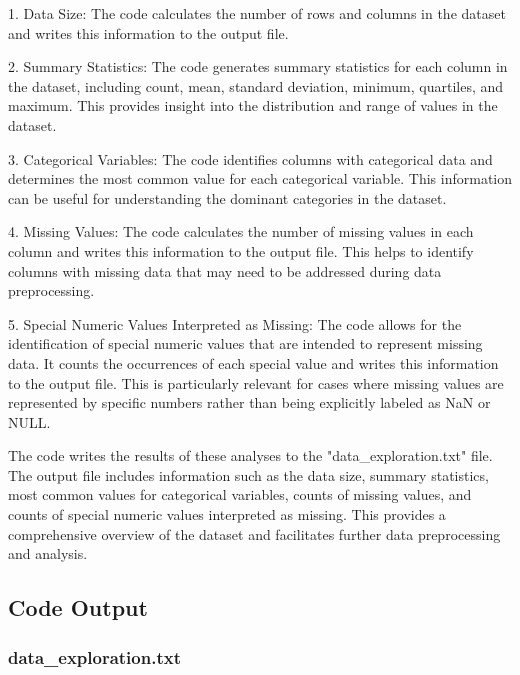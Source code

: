 \documentclass[11pt]{article}
\begin{document}
1. Data Size: The code calculates the number of rows and columns in the dataset and writes this information to the output file.

2. Summary Statistics: The code generates summary statistics for each column in the dataset, including count, mean, standard deviation, minimum, quartiles, and maximum. This provides insight into the distribution and range of values in the dataset.

3. Categorical Variables: The code identifies columns with categorical data and determines the most common value for each categorical variable. This information can be useful for understanding the dominant categories in the dataset.

4. Missing Values: The code calculates the number of missing values in each column and writes this information to the output file. This helps to identify columns with missing data that may need to be addressed during data preprocessing.

5. Special Numeric Values Interpreted as Missing: The code allows for the identification of special numeric values that are intended to represent missing data. It counts the occurrences of each special value and writes this information to the output file. This is particularly relevant for cases where missing values are represented by specific numbers rather than being explicitly labeled as NaN or NULL.

The code writes the results of these analyses to the "data\_exploration.txt" file. The output file includes information such as the data size, summary statistics, most common values for categorical variables, counts of missing values, and counts of special numeric values interpreted as missing. This provides a comprehensive overview of the dataset and facilitates further data preprocessing and analysis.

\subsection{Code Output}

\subsubsection*{data\_exploration.txt}
\end{document}
